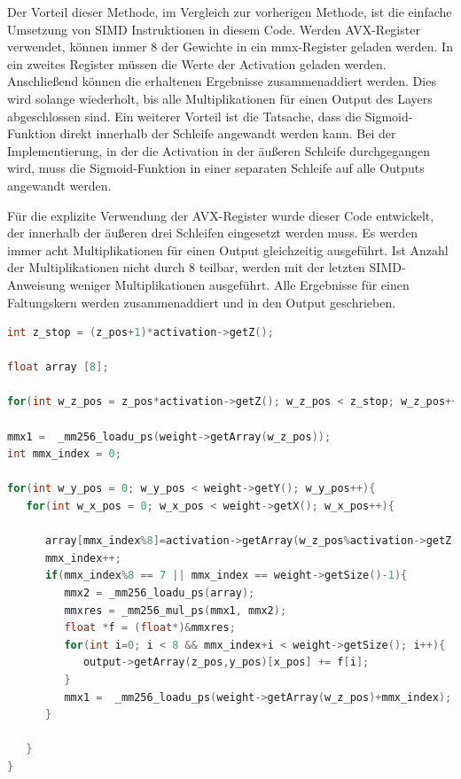 \documentclass[../main.tex]{subfiles}
\begin{document}
Der Vorteil dieser Methode, im Vergleich zur vorherigen Methode, ist die einfache Umsetzung von SIMD Instruktionen in diesem Code. Werden AVX-Register verwendet, können immer 8 der Gewichte in ein mmx-Register geladen werden. In ein zweites Register müssen die Werte der Activation geladen werden. Anschließend können die erhaltenen Ergebnisse zusammenaddiert werden. Dies wird solange wiederholt, bis alle Multiplikationen für einen Output des Layers abgeschlossen sind.
Ein weiterer Vorteil ist die Tatsache, dass die Sigmoid-Funktion direkt innerhalb der Schleife angewandt werden kann. Bei der Implementierung, in der die Activation in der äußeren Schleife durchgegangen wird, muss die Sigmoid-Funktion in einer separaten Schleife auf alle Outputs angewandt werden.

Für die explizite Verwendung der AVX-Register wurde dieser Code entwickelt, der innerhalb der äußeren drei Schleifen eingesetzt werden muss. Es werden immer acht Multiplikationen für einen Output gleichzeitig ausgeführt. Ist Anzahl der Multiplikationen nicht durch 8 teilbar, werden mit der letzten SIMD-Anweisung weniger Multiplikationen ausgeführt. Alle Ergebnisse für einen Faltungskern werden zusammenaddiert und in den Output geschrieben.

\begin{lstlisting}[language=c++, caption=Implementierung des Convolutional Layers mit AVX, captionpos=b, label=listing:conv_avx, frame=single, linewidth=\textwidth, breaklines=true]
int z_stop = (z_pos+1)*activation->getZ();

float array [8];

for(int w_z_pos = z_pos*activation->getZ(); w_z_pos < z_stop; w_z_pos++){

mmx1 =  _mm256_loadu_ps(weight->getArray(w_z_pos));
int mmx_index = 0;

for(int w_y_pos = 0; w_y_pos < weight->getY(); w_y_pos++){
   for(int w_x_pos = 0; w_x_pos < weight->getX(); w_x_pos++){
   
      array[mmx_index%8]=activation->getArray(w_z_pos%activation->getZ(), y_pos+w_y_pos)[x_pos+w_x_pos];
      mmx_index++;
      if(mmx_index%8 == 7 || mmx_index == weight->getSize()-1){
         mmx2 = _mm256_loadu_ps(array);
         mmxres = _mm256_mul_ps(mmx1, mmx2);
         float *f = (float*)&mmxres;
         for(int i=0; i < 8 && mmx_index+i < weight->getSize(); i++){
            output->getArray(z_pos,y_pos)[x_pos] += f[i];
         }
         mmx1 =  _mm256_loadu_ps(weight->getArray(w_z_pos)+mmx_index);
      }
      
   }
}
\end{lstlisting}
\end{document}
